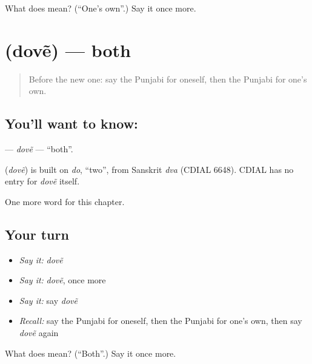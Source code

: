 \begin{tcolorbox}[breakable,colback=teal!4,colframe=teal!35!black,title={Before you move on}]
What does  mean? (\textquotedblleft{}One's own\textquotedblright{}.) Say it once more.
\end{tcolorbox}
\section[\texorpdfstring{\pa{ਦੋਵੇਂ} (dovẽ)}{ਦੋਵੇਂ (dovẽ)}]{ (dovẽ) — both}

\label{lesson:PA-C107-dove}



\begin{quote}
Before the new one: say the Punjabi for oneself, then the Punjabi for one's own.
\end{quote}

\subsection*{You'll want to know: }
\textbf{} — \emph{dovẽ} — \textquotedblleft{}both\textquotedblright{}.

\begin{cousinweb}
\textbf{} (\emph{dovẽ}) is built on \emph{do}, \textquotedblleft{}two\textquotedblright{}, from Sanskrit \emph{dva} (CDIAL 6648). CDIAL has no entry for \emph{dovẽ} itself.
\end{cousinweb}

\begin{grammarlens}[title={What you've built}]
One more word for this chapter.
\end{grammarlens}

\subsection*{Your turn}
\begin{itemize}
\raggedright
  \item \emph{Say it:} \emph{dovẽ}
  \item \emph{Say it:} \emph{dovẽ}, once more
  \item \emph{Say it:} say \emph{dovẽ}
  \item \emph{Recall:} say the Punjabi for oneself, then the Punjabi for one's own, then say \emph{dovẽ} again
\end{itemize}

\begin{tcolorbox}[breakable,colback=teal!4,colframe=teal!35!black,title={Before you move on}]
What does  mean? (\textquotedblleft{}Both\textquotedblright{}.) Say it once more.
\end{tcolorbox}
